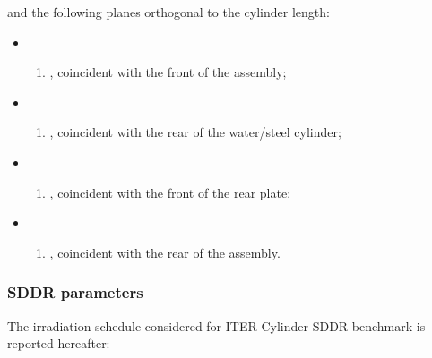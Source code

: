 \documentclass[letterpaper,10pt,english]{sphinxmanual}
\begin{document}
\sphinxAtStartPar
and the following planes orthogonal to the cylinder length:
\begin{itemize}
\item {} \begin{enumerate}
%
\setcounter{enumi}{13}
\item {} 
, coincident with the front of the assembly;

\end{enumerate}

\item {} \begin{enumerate}
%
\setcounter{enumi}{13}
\item {} 
, coincident with the rear of the water/steel cylinder;

\end{enumerate}

\item {} \begin{enumerate}
%
\setcounter{enumi}{13}
\item {} 
, coincident with the front of the rear plate;

\end{enumerate}

\item {} \begin{enumerate}
%
\setcounter{enumi}{13}
\item {} 
, coincident with the rear of the assembly.

\end{enumerate}

\end{itemize}


\subsubsection{SDDR parameters}
\label{\detokenize{usage/benchmarks:id10}}
\sphinxAtStartPar
The irradiation schedule considered for ITER Cylinder SDDR benchmark is
reported hereafter:
\end{document}
